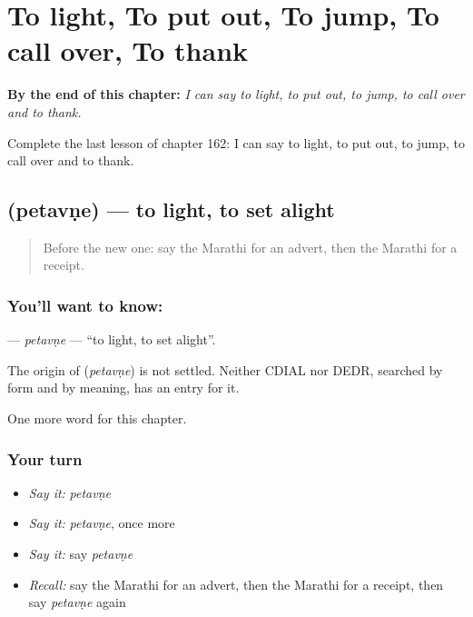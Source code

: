 
\chapter{To light, To put out, To jump, To call over, To thank}
\label{ch:mr-to-light-to-put-out-to-jump-to-call-over-to-thank}

\begin{chapteropening}
\textbf{By the end of this chapter:} \emph{I can say to light, to put out, to jump, to call over and to thank.}

Complete the last lesson of chapter 162: I can say to light, to put out, to jump, to call over and to thank.
\end{chapteropening}

\section[\texorpdfstring{\mr{पेटवणे} (petavṇe)}{पेटवणे (petavṇe)}]{ (petavṇe) — to light, to set alight}

\label{lesson:MR-C162-petavne}



\begin{quote}
Before the new one: say the Marathi for an advert, then the Marathi for a receipt.
\end{quote}

\subsection*{You'll want to know: }
\textbf{} — \emph{petavṇe} — \textquotedblleft{}to light, to set alight\textquotedblright{}.

\begin{cousinweb}
The origin of \textbf{} (\emph{petavṇe}) is not settled. Neither CDIAL nor DEDR, searched by form and by meaning, has an entry for it.
\end{cousinweb}

\begin{grammarlens}[title={What you've built}]
One more word for this chapter.
\end{grammarlens}

\subsection*{Your turn}
\begin{itemize}
\raggedright
  \item \emph{Say it:} \emph{petavṇe}
  \item \emph{Say it:} \emph{petavṇe}, once more
  \item \emph{Say it:} say \emph{petavṇe}
  \item \emph{Recall:} say the Marathi for an advert, then the Marathi for a receipt, then say \emph{petavṇe} again
\end{itemize}

